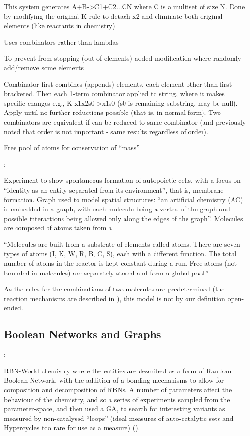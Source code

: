 This system generates A+B-\textgreater{}C1+C2...CN where C is a multiset of size N. Done by modifying the original K rule to detach x2 and eliminate both original elements (like reactants in chemistry)

Uses combinators rather than lambdas

To prevent from stopping (out of elements) added modification where randomly add/remove some elements

Combinator first combines (appends) elements, each element other than first bracketed. Then each 1-term combinator applied to string, where it makes specific changes e.g., K x1x2s0-\textgreater{}x1s0 (s0 is remaining substring, may be null). Apply until no further reductions possible (that is, in normal form). Two combinators are equivalent if can be reduced to same combinator (and previously noted that order is not important - same results regardless of order).

Free pool of atoms for conservation of ``mass''

\parencite{Fenizio2001}:

Experiment to show spontaneous formation of autopoietic cells, with a focus on ``identity as an entity separated from its environment'', that is, membrane formation. Graph used to model spatial structures: ``an artificial chemistry (AC) is embedded in a graph, with each molecule being a vertex of the graph and possible interactions being allowed only along the edges of the graph''. Molecules are composed of atoms taken from a 

``Molecules are built from a substrate of elements called atoms. There are seven types of atoms (I, K, W, R, B, C, S), each with a different function. The total number of atoms in the reactor is kept constant during a run. Free atoms (not bounded in molecules) are separately stored and form a global pool.''

As the rules for the combinations of two molecules are predetermined (the reaction mechanisms are described in \cite{Fenizio2000}), this model is not by our definition open-ended.

\subsection{Boolean Networks and Graphs}



\parencite{Faulconbridge2010, Faulconbridge2011}:

RBN-World \cite{Faulconbridge2011} chemistry where the entities are described as a form of Random Boolean Network, with the addition of a bonding mechanisms to allow for composition and decomposition of RBNs. A number of parameters affect the behaviour of the chemistry, and so a series of experiments sampled from the parameter-space, and then used a GA, to search for interesting variants as measured by non-catalysed ``loops'' (ideal measures of auto-catalytic sets and Hypercycles too rare for use as a measure) (\cite[§8]{Faulconbridge2011}). 

